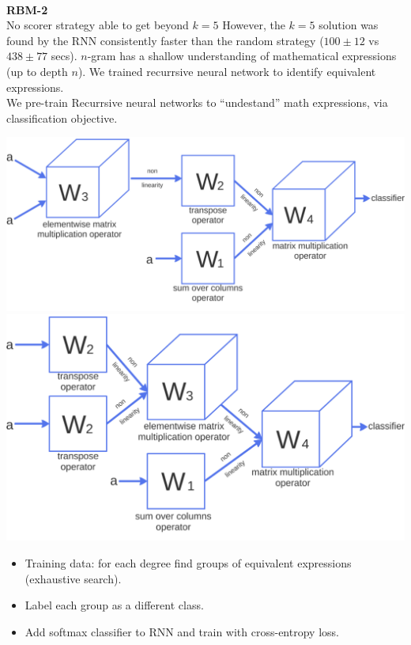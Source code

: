 \documentclass[landscape,a0b]{a0poster_csml_v2}
\begin{document}
\begin{poster}
\begin{PosterColumn}
\begin{minipage}[hc]{\textwidth}
\begin{center}
\begin{tabular}{cccc}
      \end{tabular}
  \end{center}
\end{minipage}
\\
{\bf RBM-2}\\
No scorer strategy able to get beyond $k=5$ 
However, the $k = 5$ solution was found by the RNN consistently faster than the random strategy ($100 \pm 12$ vs $438 \pm 77$ secs). 
$n$-gram has a shallow understanding of mathematical expressions (up to depth $n$).
We trained recurrsive neural network to identify equivalent expressions.\\
We pre-train Recurrsive neural networks to ``undestand'' math expressions, via
classification objective.\\
\begin{minipage}[hc]{\textwidth}
  \hfill
  \includegraphics[width=0.4\linewidth]{imgs/tnn.png}
  \hfill
  \includegraphics[width=0.4\linewidth]{imgs/tnn2.png}
  \hfill
\end{minipage}

\begin{itemize}
  \item Training data: for each degree find groups of equivalent expressions (exhaustive search).
  \item Label each group as a different class.
  \item Add softmax classifier to RNN and train with cross-entropy loss.
\end{itemize}


\end{PosterColumn}
\end{poster}
\end{document}
